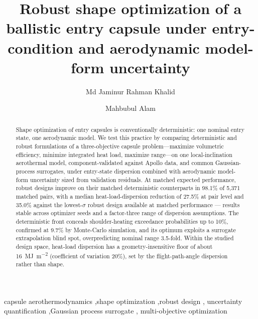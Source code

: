 \documentclass[preprint,12pt]{elsarticle}
\begin{document}
\begin{frontmatter}

\title{Robust shape optimization of a ballistic entry capsule under
entry-condition and aerodynamic model-form uncertainty}

\author[a]{Md Jaminur Rahman Khalid}
\author[a]{Mahbubul Alam}

\begin{abstract}
Shape optimization of entry capsules is conventionally deterministic: one
nominal entry state, one aerodynamic model. We test this practice by
comparing deterministic and robust formulations of a three-objective
capsule problem---maximize volumetric efficiency, minimize integrated
heat load, maximize range---on one local-inclination aerothermal model,
component-validated against Apollo data, and common Gaussian-process
surrogates, under entry-state dispersion combined with aerodynamic
model-form uncertainty sized from validation residuals. At matched
expected performance, robust designs improve on their matched
deterministic counterparts in 98.1\% of 5{,}371 matched pairs, with a
median heat-load-dispersion reduction of 27.5\% at pair level and 35.0\%
against the lowest-$\sigma$ robust design available at matched
performance --- results stable across optimizer seeds and a factor-three
range of dispersion assumptions. The
deterministic front conceals shoulder-heating exceedance probabilities up
to 10\%, confirmed at 9.7\% by Monte-Carlo simulation, and its optimum
exploits a surrogate extrapolation blind spot, overpredicting nominal
range 3.5-fold. Within the studied design space, heat-load dispersion has
a geometry-insensitive floor of about
\SI{16}{\mega\joule\per\square\metre} (coefficient of variation 20\%),
set by the flight-path-angle dispersion rather than shape.
\end{abstract}

\begin{keyword}
capsule aerothermodynamics \sep shape optimization \sep robust design \sep
uncertainty quantification \sep Gaussian process surrogate \sep
multi-objective optimization
\end{keyword}

\end{frontmatter}
\end{document}
